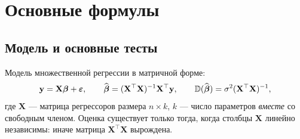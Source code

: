 %
%
%
%


\ifsolutions
\section{Основные формулы}

\subsection{Модель и основные тесты}\label{sec:model}

Модель множественной регрессии в матричной форме:
\begin{equation}
  \mathbf{y} = \mathbf{X}\boldsymbol{\beta} + \boldsymbol{\varepsilon},
  \qquad
  \widehat{\boldsymbol{\beta}} = (\mathbf{X}^{\top}\mathbf{X})^{-1}\mathbf{X}^{\top}\mathbf{y},
  \qquad
  \mathbb{D}(\widehat{\boldsymbol{\beta}}) = \sigma^2(\mathbf{X}^{\top}\mathbf{X})^{-1},
  \label{eq:ols}
\end{equation}
где $\mathbf{X}$ — матрица регрессоров размера $n\times k$, $k$ — число
параметров \emph{вместе} со свободным членом. Оценка существует только тогда,
когда столбцы $\mathbf{X}$ линейно независимы: иначе матрица
$\mathbf{X}^{\top}\mathbf{X}$ вырождена.

